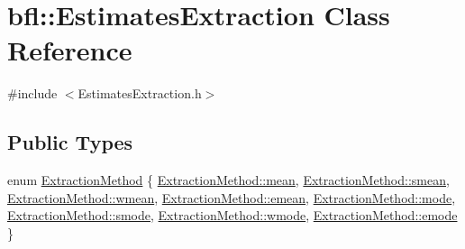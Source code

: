 \hypertarget{classbfl_1_1EstimatesExtraction}{}\section{bfl\+:\+:Estimates\+Extraction Class Reference}
\label{classbfl_1_1EstimatesExtraction}


{\ttfamily \#include $<$Estimates\+Extraction.\+h$>$}

\subsection*{Public Types}
\begin{DoxyCompactItemize}
\item 
enum \mbox{\hyperlink{classbfl_1_1EstimatesExtraction_a8489976af4025f0bbc3288ff7f17ffb0}{Extraction\+Method}} \{ \newline
\mbox{\hyperlink{classbfl_1_1EstimatesExtraction_a8489976af4025f0bbc3288ff7f17ffb0ab93db188572fc4d76cce5660f3823b0a}{Extraction\+Method\+::mean}}, 
\mbox{\hyperlink{classbfl_1_1EstimatesExtraction_a8489976af4025f0bbc3288ff7f17ffb0abbc9c90f98a268f78971d2e670dd527e}{Extraction\+Method\+::smean}}, 
\mbox{\hyperlink{classbfl_1_1EstimatesExtraction_a8489976af4025f0bbc3288ff7f17ffb0a1d2c4e9e69cf765aa9ff84e8a69501cd}{Extraction\+Method\+::wmean}}, 
\mbox{\hyperlink{classbfl_1_1EstimatesExtraction_a8489976af4025f0bbc3288ff7f17ffb0a1f31c7680951dbcb0768323cfd1e7726}{Extraction\+Method\+::emean}}, 
\newline
\mbox{\hyperlink{classbfl_1_1EstimatesExtraction_a8489976af4025f0bbc3288ff7f17ffb0a15d61712450a686a7f365adf4fef581f}{Extraction\+Method\+::mode}}, 
\mbox{\hyperlink{classbfl_1_1EstimatesExtraction_a8489976af4025f0bbc3288ff7f17ffb0a2c3917a1bbad7f91dfa6d1d524e83888}{Extraction\+Method\+::smode}}, 
\mbox{\hyperlink{classbfl_1_1EstimatesExtraction_a8489976af4025f0bbc3288ff7f17ffb0ac6e4db54fbd05bde785ef07a442b50f5}{Extraction\+Method\+::wmode}}, 
\mbox{\hyperlink{classbfl_1_1EstimatesExtraction_a8489976af4025f0bbc3288ff7f17ffb0a68aa9a30f26a7648656847fd30c44144}{Extraction\+Method\+::emode}}
 \}
\end{DoxyCompactItemize}

